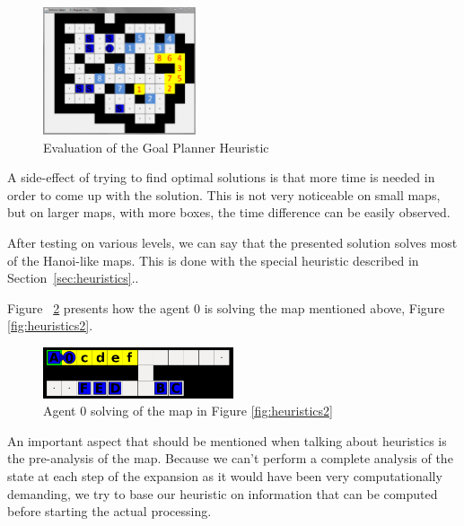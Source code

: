 \begin{figure}[htb]

\begin{center}

\includegraphics[width=0.4\textwidth]{figures/example_goal_planner}

\caption{Evaluation of the Goal Planner Heuristic}

\label{fig:goalplanneraresults}

\end{center}

\end{figure}

A side-effect of trying to find optimal solutions is that more time is needed in order to come up with the
solution. This is not very noticeable on small maps, but on larger maps, with more boxes, the time difference
can be easily observed.

After testing on various levels, we can say that the presented solution solves most of the Hanoi-like maps.
This is done with the special heuristic described in Section~\ref{sec:heuristics}..

Figure ~\ref{fig:results_hanoi} presents how the agent 0 is solving the map mentioned above, Figure
\ref{fig:heuristics2}.

\begin{figure}[htb]
\begin{center}
\includegraphics[width=0.5\textwidth]{figures/results_hanoi.png}
\caption{Agent 0 solving of the map in Figure \ref{fig:heuristics2}}
\label{fig:results_hanoi}
\end{center}
\end{figure}

An important aspect that should be mentioned when talking about heuristics is the pre-analysis of the map.
Because we can’t perform a complete analysis of the state at each step of the expansion as it would have been
very computationally demanding, we try to base our heuristic on information that can be computed before
starting the actual processing.

